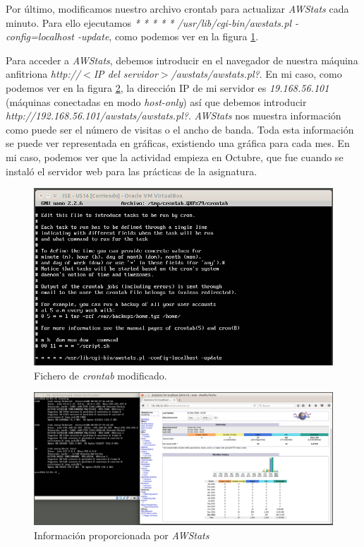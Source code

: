 \documentclass[a4paper,titlepage,12pt]{scrartcl}	%
\numberwithin{figure}{section} %
\numberwithin{table}{section} %
\begin{document}
	Por último, modificamos nuestro archivo crontab para actualizar \textit{AWStats} cada minuto. Para ello ejecutamos \textit{* * * * * /usr/lib/cgi-bin/awstats.pl -config=localhost -update}, como podemos ver en la figura \ref{O6-3}.
	
	Para acceder a \textit{AWStats}, debemos introducir en el navegador de nuestra máquina anfitriona \textit{
	http://$<$IP del servidor$>$/awstats/awstats.pl?}. En mi caso, como podemos ver en la figura \ref{O6-4}, la dirección IP de mi servidor es \textit{19.168.56.101} (máquinas conectadas en modo \textit{host-only}) así que debemos introducir \textit{http://192.168.56.101/awstats/awstats.pl?}. \textit{AWStats} nos muestra información como puede ser el número de visitas o el ancho de banda. Toda esta información se puede ver representada en gráficas, existiendo una gráfica para cada mes. En mi caso, podemos ver que la actividad empieza en Octubre, que fue cuando se instaló el servidor web para las prácticas de la asignatura.
	
	\begin{figure}[H]
		\includegraphics[width=\linewidth]{./Imagenes/O6-3.png}
		\vspace{-0.5cm}
		\caption[Fichero de \textit{crontab} modificado.]{Fichero de \textit{crontab} modificado.}
		\label{O6-3}
	\end{figure}
	
	\begin{figure}[H]
		\includegraphics[width=\linewidth]{./Imagenes/O6-4.png}
		\vspace{-0.5cm}
		\caption[Información proporcionada por \textit{AWStats}.]{Información proporcionada por \textit{AWStats}}
		\label{O6-4}
	\end{figure}
	
\end{document}
